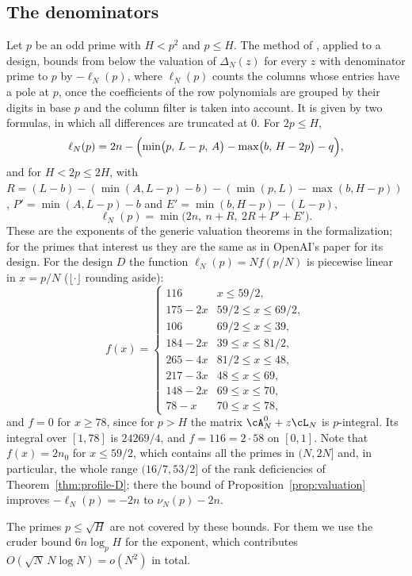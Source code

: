 \subsection{The denominators}
Let $p$ be an odd prime with $H<p^2$ and $p\le H$. The method of \cite[\S3]{OpenAI2026}, applied to a
design, bounds from below the valuation of $\Delta_N(z)$ for every $z$ with denominator prime to $p$ by
$-\ell_N(p)$, where $\ell_N(p)$ counts the columns whose entries have a pole at $p$, once the coefficients of
the row polynomials are grouped by their digits in base $p$ and the column filter is taken into account. It
is given by two formulas, in which all differences are truncated at $0$. For $2p\le H$,
\[
 \ell_N(p)=2n-\Bigl(\min\bigl(p,\,L-p,\,A\bigr)-\max\bigl(b,\,H-2p\bigr)-q\Bigr),
\]
and for $H<2p\le2H$, with $R=(L-b)-(\min(A,L-p)-b)-(\min(p,L)-\max(b,H-p))$,
$P'=\min(A,L-p)-b$ and $E'=\min(b,H-p)-(L-p)$,
\[
 \ell_N(p)=\min\bigl(2n,\ n+R,\ 2R+P'+E'\bigr).
\]
These are the exponents of the generic valuation theorems in the formalization; for the primes that
interest us they are the same as in OpenAI's paper for its design. For the design $D$ the function
$\ell_N(p)=Nf(p/N)$ is piecewise linear in $x=p/N$ ($\lfloor\cdot\rfloor$ rounding aside):
\[
 f(x)=\begin{cases}
 116&x\le59/2,\\
 175-2x&59/2\le x\le69/2,\\
 106&69/2\le x\le39,\\
 184-2x&39\le x\le81/2,\\
 265-4x&81/2\le x\le48,\\
 217-3x&48\le x\le69,\\
 148-2x&69\le x\le70,\\
 78-x&70\le x\le78,
 \end{cases}
\]
and $f=0$ for $x\ge78$, since for $p>H$ the matrix $\cA^0_N+z\cL_N$ is $p$-integral. Its integral over
$[1,78]$ is $24269/4$, and $f=116=2\cdot58$ on $[0,1]$. Note that $f(x)=2n_0$ for $x\le59/2$, which
contains all the primes in $(N,2N]$ and, in particular, the whole range $(16/7,53/2]$ of the rank
deficiencies of Theorem~\ref{thm:profile-D}; there the bound of Proposition~\ref{prop:valuation} improves
$-\ell_N(p)=-2n$ to $\nu_N(p)-2n$.

The primes $p\le\sqrt H$ are not covered by these bounds. For them we use the cruder bound
$6n\log_pH$ for the exponent, which contributes $O(\sqrt N\,N\log N)=o(N^2)$ in total.

